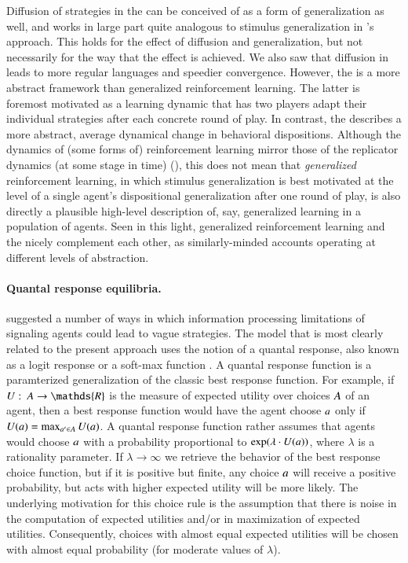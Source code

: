 Diffusion of strategies in the \rdd can be conceived of as a form of
generalization as well, and works in large part quite analogous to
stimulus generalization in \citeauthor{OConnor2013:The-Evolution-o}'s
approach. This holds for the effect of diffusion and generalization,
but not necessarily for the way that the effect is achieved. We also
saw that diffusion in \rdd leads to more regular languages and
speedier convergence. However, the \rdd is a more abstract framework
than generalized reinforcement learning. The latter is foremost
motivated as a learning dynamic that has two players adapt their
individual strategies after each concrete round of play. In contrast,
the \rdd describes a more abstract, average dynamical change in
behavioral dispositions. Although the dynamics of (some forms of)
reinforcement learning mirror those of the replicator dynamics (at
some stage in time) (\cite{Borgers1997,Hopkins2005,Beggs2005}), this
does not mean that \emph{generalized} reinforcement learning, in which
stimulus generalization is best motivated at the level of a single
agent's dispositional generalization after one round of play, is also
directly a plausible high-level description of, say, generalized
learning in a population of agents. Seen in this light, generalized
reinforcement learning and the \rdd nicely complement each other, as
similarly-minded accounts operating at different levels of
abstraction. 

\paragraph{Quantal response equilibria.}
\citet{FrankeJager2010:Vagueness-Signa} suggested a number of ways in
which information processing limitations of signaling agents could
lead to vague strategies. The model that is most clearly related to
the present approach uses the notion of a quantal response, also known
as a logit response or a soft-max function
\citep[e.g.][]{Luce1959:Individual-Choi,McFadden1976:Quantal-Choice-,McKelveyPalfrey1995:Quantal-Respons,McKelveyPalfrey1998:Quantal-Respons,GoereeHolt2008:Quantal-Respons}. A
quantal response function is a paramterized generalization of the
classic best response function. For example, if $U \mycolon \Acts
\rightarrow \mathds{R}$ is the measure of expected utility over
choices $A$ of an agent, then a best response function would have
the agent choose $a$ only if $U(a) = \max_{a' \in A}
U(a)$. A quantal response function rather assumes that agents would
choose $a$ with a probability proportional to $\operatorname{exp}(\lambda \cdot
U(a))$, where $\lambda$ is a rationality parameter. If $\lambda
\rightarrow \infty$ we retrieve the behavior of the best response
choice function, but if it is positive but finite, any choice $a$
will receive a positive probability, but acts with higher expected
utility will be more likely. The underlying motivation for this choice
rule is the assumption that there is noise in the computation of
expected utilities and/or in maximization of expected
utilities. Consequently, choices with almost equal expected utilities
will be chosen with almost equal probability (for moderate values of
$\lambda$). 


